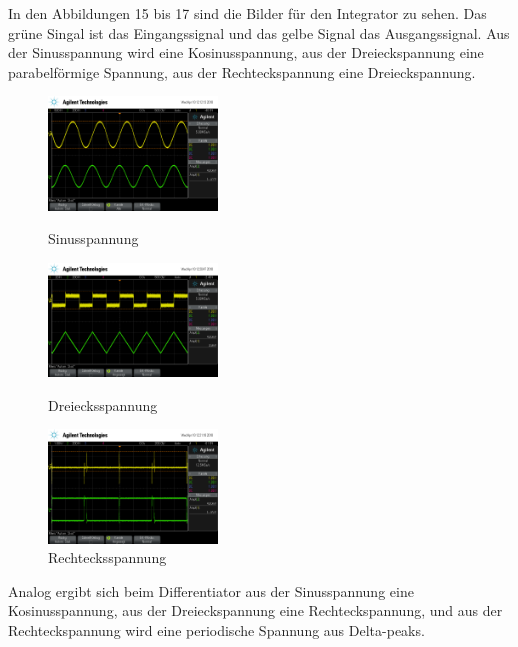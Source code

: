 \documentclass{scrartcl}
\begin{document}
In den Abbildungen 15 bis 17 sind die Bilder für den Integrator zu sehen.  Das grüne Singal ist das Eingangssignal und das gelbe Signal das Ausgangssignal.
Aus der Sinusspannung wird eine Kosinusspannung, aus der Dreieckspannung eine parabelförmige Spannung, aus der Rechteckspannung eine Dreieckspannung.
\begin{figure}[H]
\centering
\includegraphics[width=0.4\textwidth]{aufnahmen_neu/scope_190.png}
\caption{Sinusspannung}
\label{verstaerker}

\includegraphics[width=0.4\textwidth]{aufnahmen_neu/scope_191.png}
\caption{Dreiecksspannung}
\label{verstaerker}

\includegraphics[width=0.4\textwidth]{aufnahmen_neu/scope_193.png}
\caption{Rechtecksspannung}
\label{verstaerker}
\end{figure}
\noindent
Analog ergibt sich beim Differentiator aus der Sinusspannung eine Kosinusspannung, aus der Dreieckspannung eine Rechteckspannung, und aus der Rechteckspannung wird eine periodische Spannung aus Delta-peaks.
\newpage
\end{document}
